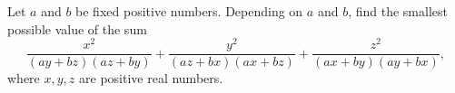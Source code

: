Let $a$ and $b$ be fixed positive numbers. Depending on $a$ and $b$,
find the smallest possible value of the sum
$$\frac{x^2}{(ay+bz)(az+by)}+\frac{y^2}{(az+bx)(ax+bz)}+\frac{z^2}{(ax+by)(ay+bx)},$$
where $x,y,z$ are positive real numbers.